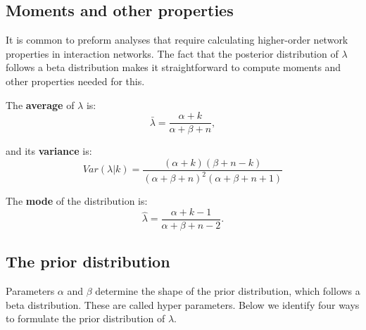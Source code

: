 \documentclass[12pt]{article}
\begin{document}
\begin{spacing}{2.0}


    \subsection*{Moments and other properties}

      It is common to preform analyses that require calculating higher-order network properties in interaction networks. The fact that the posterior distribution of $\lambda$ follows a beta distribution makes it straightforward to compute moments and other properties needed for this. 

      The \textbf{average} of $\lambda$ is: 
          \begin{equation}
            \bar{\lambda} = \frac{\alpha+k}{\alpha+\beta+n} ,
            \label{mean}
          \end{equation}

        and its \textbf{variance} is:  
          \begin{equation}
            Var(\lambda|k) = \frac{(\alpha + k)(\beta + n - k)}{(\alpha + \beta + n)^{2}(\alpha + \beta + n +1)}
            \label{variance}
          \end{equation}

        The \textbf{mode} of the distribution is:
          \begin{equation}
            \hat{\lambda} = \frac{\alpha + k - 1}{\alpha + \beta + n - 2} .
            \label{mode}
          \end{equation}

    \subsection*{The prior distribution}    

      Parameters $\alpha$ and $\beta$ determine the shape of the prior distribution, which follows a beta distribution. These are called hyper parameters. Below we identify four ways to formulate the prior distribution of $\lambda$. 


\end{spacing}
\end{document}
